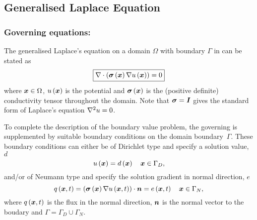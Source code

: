 \subsection{Generalised Laplace Equation}


\subsubsection{Governing equations:}

The generalised Laplace's equation on a domain $\Omega$ with boundary $\Gamma$
in \OpenCMISS can be stated as
\begin{equation}
  \boxed{
    \divergence{}{\pbrac{\fnof{\tensor{\sigma}}{\vect{x}}\gradient{}{\fnof{u}{\vect{x}}}}}=0
  }
  \label{eqn:generalisedLaplaceequation}
\end{equation}
where $\vect{x}\in\Omega$, $\fnof{u}{\vect{x}}$ is the potential and 
$\fnof{\tensor{\sigma}}{\vect{x}}$ is the (positive definite) conductivity
tensor throughout the domain. Note that $\boldsymbol{\mathit{\sigma}}=\boldsymbol{\mathit{I}}$ gives 
the standard form of Laplace's equation \ie $\nabla^{2} {u}=0$.

To complete the description of the boundary value problem,
the governing  is supplemented
by suitable boundary conditions on the domain boundary~$\Gamma$.
These boundary conditions can either be of Dirichlet type and specify a
solution value, $d$ \ie
\begin{equation}
  \fnof{u}{\vect{x}} = \fnof{d}{\vect{x}} \quad \vect{x}\in\Gamma_{D},
  \label{eqn:LaplaceDirichletBC} 
\end{equation}
and/or of Neumann type and specify the solution gradient in normal direction,
$e$ \ie
\begin{equation}
  \fnof{q}{\vect{x},t} = \dotprod{\pbrac{\fnof{\tensor{\sigma}}{\vect{x}}
      \gradient{}{\fnof{u}{\vect{x},t}}}}{\normal} =
  \fnof{e}{\vect{x},t} \quad \vect{x}\in\Gamma_{N},  
  \label{eqn:LaplaceNeumannBC} 
\end{equation}
where $\fnof{q}{\vect{x},t}$ is the flux in the normal direction, $\boldsymbol{n}$ is the normal
vector to the boudary and $\Gamma = \Gamma_D \cup \Gamma_N$.

